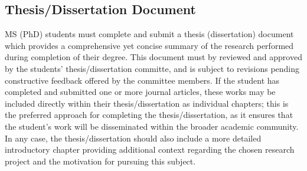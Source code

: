 \documentclass[12pt,a4paper,article,oneside]{memoir} %
\begin{document}
\subsection{Thesis/Dissertation Document}

MS (PhD) students must complete and submit a thesis (dissertation) document which provides a comprehensive yet concise summary of the research performed during completion of their degree. This document must by reviewed and approved by the students' thesis/dissertation committe, and is subject to revisions pending constructive feedback offered by the committee members. If the student has completed and submitted one or more journal articles, these works may be included directly within their thesis/dissertation as individual chapters; this is the preferred approach for completing the thesis/dissertation, as it ensures that the student's work will be disseminated within the broader academic community. In any case, the thesis/dissertation should also include a more detailed introductory chapter providing additional context regarding the chosen research project and the motivation for pursuing this subject.
\end{document}
